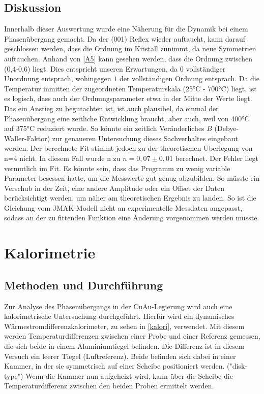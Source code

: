 \documentclass[
	a4paper,
	12pt,
	pagesize,
	ngerman
]{scrartcl}
\begin{document}
\subsection{Diskussion}
Innerhalb dieser Auswertung wurde eine Näherung für die Dynamik bei einem Phasenübergang gemacht. Da der (001) Reflex wieder auftaucht, kann darauf geschlossen werden, dass die Ordnung im Kristall zunimmt, da neue Symmetrien auftauchen. Anhand von \cref{A5} kann gesehen werden, dass die Ordnung zwischen (0,4-0,6) liegt. Dies entspricht unseren Erwartungen, da $0$ vollständiger Unordnung entsprach, wohingegen $1$ der vollständigen Ordnung entsprach. Da die Temperatur inmitten der zugeordneten Temperaturskala (25°C - 700°C) liegt, ist es logisch, dass auch der Ordnungsparameter etwa in der Mitte der Werte liegt. Das ein Anstieg zu begutachten ist, ist auch plausibel, da einmal der Phasenübergang eine zeitliche Entwicklung braucht, aber auch, weil von 400°C auf 375°C reduziert wurde. So könnte ein zeitlich Veränderliches $B$ (Debye-Waller-Faktor) zur genaueren Untersuchung dieses Sachverhaltes eingebaut werden. Der berechnete Fit stimmt jedoch zu der theoretischen Überlegung von n=4 nicht. In diesem Fall wurde n zu $n=0,07 \pm 0,01$ berechnet. Der Fehler liegt vermutlich im Fit. Es könnte sein, dass das Programm zu wenig variable Parameter besessen hatte, um die Messwerte gut genug abzubilden. So müsste ein Verschub in der Zeit, eine andere Amplitude oder ein Offset der Daten berücksichtigt werden, um näher am theoretischen Ergebnis zu landen. So ist die Gleichung vom JMAK-Modell nicht an experimentelle Messdaten angepasst, sodass an der zu fittenden Funktion eine Änderung vorgenommen werden müsste.

\newpage

\section{Kalorimetrie}
\subsection{Methoden und Durchführung}
Zur Analyse des Phasenübergangs in der CuAu-Legierung wird auch eine kalorimetrische Untersuchung durchgeführt. Hierfür wird ein dynamisches Wärmestromdifferenzkalorimeter, zu sehen in \cref{kalori}, verwendet. Mit diesem werden Temperaturdifferenzen zwischen einer Probe und einer Referenz gemessen, die sich beide in einem Aluminiumtiegel befinden. Die Differenz ist in diesem Versuch ein leerer Tiegel (Luftreferenz). Beide befinden sich dabei in einer Kammer, in der sie symmetrisch auf einer Scheibe positioniert werden. ("disk-type") Wenn die Kammer nun aufgeheizt wird, kann über die Scheibe die Temperaturdifferenz zwischen den beiden Proben ermittelt werden.
\end{document}
